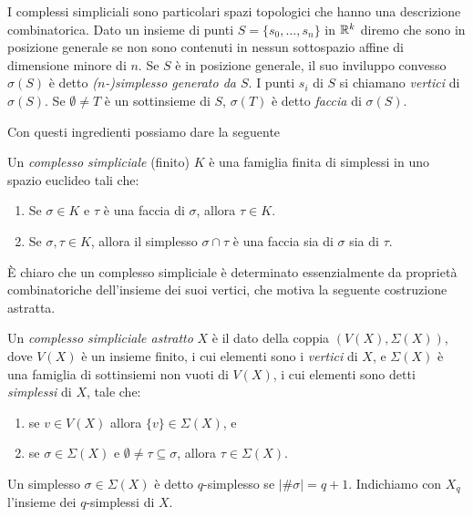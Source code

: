 \begin{sloppypar}
  I complessi simpliciali sono particolari spazi topologici che hanno una descrizione combinatorica. Dato un insieme di punti ${S=\{s_0,\dots,s_n\}}$ in $\mathbb{R}^k$ diremo che sono in posizione generale se non sono contenuti in nessun sottospazio affine di dimensione minore di $n$. Se $S$ è in posizione generale, il suo inviluppo convesso $\sigma(S)$ è detto \emph{($n$-)simplesso generato da $S$}. I punti $s_i$ di $S$ si chiamano \emph{vertici} di $\sigma(S)$. Se $\emptyset\neq T$ è un sottinsieme di $S$, $\sigma(T)$ è detto \emph{faccia} di $\sigma(S)$.
\end{sloppypar}

Con questi ingredienti possiamo dare la seguente
\begin{definition}
Un \emph{complesso simpliciale} (finito) $K$ è una famiglia finita di simplessi in uno spazio euclideo tali che:
\begin{enumerate}
  \item Se $\sigma\in K$ e $\tau$ è una faccia di $\sigma$, allora $\tau \in K$.
  \item Se $\sigma,\tau\in K$, allora il simplesso $\sigma\cap\tau$ è una faccia sia di $\sigma$ sia di $\tau$.
\end{enumerate}
\end{definition}

\`E chiaro che un complesso simpliciale è determinato essenzialmente da proprietà combinatoriche dell'insieme dei suoi vertici, che motiva la seguente costruzione astratta.

\begin{definition}
  Un \emph{complesso simpliciale astratto} $X$ è il dato della coppia $(V(X), \Sigma(X))$, dove $V(X)$ è un insieme finito, i cui elementi sono i \emph{vertici} di $X$, e $\Sigma(X)$ è una famiglia di sottinsiemi non vuoti di $V(X)$, i cui elementi sono detti \emph{simplessi} di $X$, tale che:
  \begin{enumerate}
    \item se $v\in V(X)$ allora $\{v\}\in\Sigma(X)$, e
    \item se $\sigma \in \Sigma(X)$ e $\emptyset\neq\tau\subseteq\sigma$, allora $\tau\in\Sigma(X)$.
  \end{enumerate}

  Un simplesso $\sigma\in\Sigma(X)$ è detto $q$-simplesso se $|\#\sigma| = q+1$. Indichiamo con $X_q$ l'insieme dei $q$-simplessi di $X$.
\end{definition}

